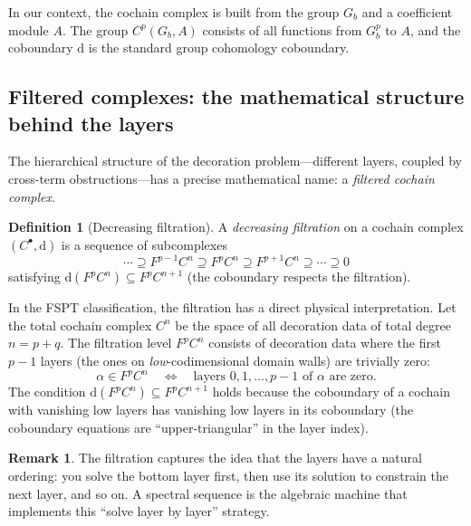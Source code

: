 \documentclass{SciPost}
\theoremstyle{definition}
\newtheorem{definition}[theorem]{Definition}
\newtheorem{remark}[theorem]{Remark}
\newcommand{\Gb}{G_b}
\newcommand{\dd}{\mathrm{d}}
\begin{document}
In our context, the cochain complex is built from the group $\Gb$ and a coefficient module $A$.
The group $C^p(\Gb, A)$ consists of all functions from $\Gb^p$ to $A$, and the coboundary $\dd$ is the standard group cohomology coboundary.

\subsection{Filtered complexes: the mathematical structure behind the layers}
\label{subsec:filtration}

The hierarchical structure of the decoration problem---different layers, coupled by cross-term obstructions---has a precise mathematical name: a \emph{filtered cochain complex}.

\begin{definition}[Decreasing filtration]
\label{def:filtration}
A \emph{decreasing filtration} on a cochain complex $(C^\bullet, \dd)$ is a sequence of subcomplexes
\begin{equation}
\label{eq:filtration}
\cdots \supseteq F^{p-1} C^n \supseteq F^p C^n \supseteq F^{p+1} C^n \supseteq \cdots \supseteq 0
\end{equation}
satisfying $\dd(F^p C^n) \subseteq F^p C^{n+1}$ (the coboundary respects the filtration).
\end{definition}

In the FSPT classification, the filtration has a direct physical interpretation.
Let the total cochain complex $C^n$ be the space of all decoration data of total degree $n = p + q$.
The filtration level $F^p C^n$ consists of decoration data where the first $p-1$ layers (the ones on \emph{low}-codimensional domain walls) are trivially zero:
\begin{equation}
\alpha \in F^p C^n \quad \Longleftrightarrow \quad \text{layers } 0, 1, \ldots, p-1 \text{ of } \alpha \text{ are zero.}
\end{equation}
The condition $\dd(F^p C^n) \subseteq F^p C^{n+1}$ holds because the coboundary of a cochain with vanishing low layers has vanishing low layers in its coboundary (the coboundary equations are ``upper-triangular'' in the layer index).

\begin{remark}
The filtration captures the idea that the layers have a natural ordering: you solve the bottom layer first, then use its solution to constrain the next layer, and so on.
A spectral sequence is the algebraic machine that implements this ``solve layer by layer'' strategy.
\end{remark}
\end{document}
